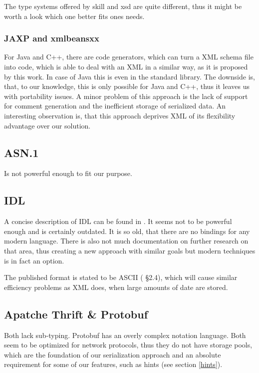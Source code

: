 The type systems offered by \gls{skill} and \gls{xsd} are quite different, thus it might be worth a look which one better fits ones needs.

\subsubsection*{JAXP and xmlbeansxx}

For Java and C++, there are code generators, which can turn a XML schema file into code, which is able to deal with an XML in a similar way, as it is proposed by this work. In case of Java this is even in the standard library. The downside is, that, to our knowledge, this is only possible for Java and C++, thus it leaves us with portability issues. A minor problem of this approach is the lack of support for comment generation and the inefficient storage of serialized data.
An interesting observation is, that this approach deprives XML of its flexibility advantage over our solution.


\subsection*{ASN.1}

Is not powerful enough to fit our purpose.


\subsection*{IDL}

A concise description of IDL can be found in \cite{lamb87}. It seems not to be powerful enough and is certainly outdated. It is so old, that there are no bindings for any modern language. There is also not much documentation on further research on that area, thus creating a new approach with similar goals but modern techniques is in fact an option.

The published format is stated to be ASCII (\cite{lamb87} §2.4), which will cause similar efficiency problems as XML does, when large amounts of date are stored.


\subsection*{Apatche Thrift \& Protobuf}

Both lack sub-typing. Protobuf has an overly complex notation language. Both seem to be optimized for network protocols, thus they do not have storage pools, which are the foundation of our serialization approach and an absolute requirement for some of our features, such as hints (see section \ref{hints}).


